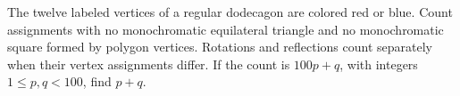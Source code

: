 The twelve labeled vertices of a regular dodecagon are colored red or blue. Count assignments with no monochromatic equilateral triangle and no monochromatic square formed by polygon vertices. Rotations and reflections count separately when their vertex assignments differ. If the count is $100p+q$, with integers $1\le p,q<100$, find $p+q$.
